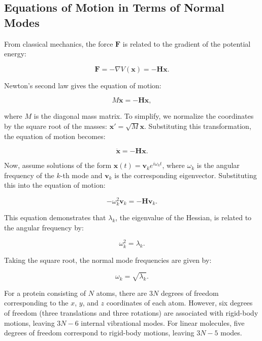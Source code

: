\documentclass[English, Lau, oneside]{sapthesis}
\begin{document}
\subsection{Equations of Motion in Terms of Normal Modes}

From classical mechanics, the force \( \mathbf{F} \) is related to the gradient of the potential energy:

\begin{equation}
\mathbf{F} = -\nabla V(\mathbf{x}) = -\mathbf{H} \mathbf{x}.
\end{equation}

Newton's second law gives the equation of motion:

\begin{equation}
M \ddot{\mathbf{x}} = -\mathbf{H} \mathbf{x},
\end{equation}

where \( M \) is the diagonal mass matrix. To simplify, we normalize the coordinates by the square root of the masses: \( \mathbf{x}' = \sqrt{M} \mathbf{x} \). Substituting this transformation, the equation of motion becomes:

\begin{equation}
\ddot{\mathbf{x}} = -\mathbf{H} \mathbf{x}.
\end{equation}

Now, assume solutions of the form \( \mathbf{x}(t) = \mathbf{v}_k e^{i \omega_k t} \), where \( \omega_k \) is the angular frequency of the \( k \)-th mode and \( \mathbf{v}_k \) is the corresponding eigenvector. Substituting this into the equation of motion:

\begin{equation}
-\omega_k^2 \mathbf{v}_k = -\mathbf{H} \mathbf{v}_k.
\end{equation}

This equation demonstrates that \( \lambda_k \), the eigenvalue of the Hessian, is related to the angular frequency by:

\begin{equation}
\omega_k^2 = \lambda_k.
\end{equation}

Taking the square root, the normal mode frequencies are given by:

\begin{equation}
\omega_k = \sqrt{\lambda_k}.
\end{equation}

For a protein consisting of \( N \) atoms, there are \( 3N \) degrees of freedom corresponding to the \( x \), \( y \), and \( z \) coordinates of each atom. However, six degrees of freedom (three translations and three rotations) are associated with rigid-body motions, leaving \( 3N - 6 \) internal vibrational modes. For linear molecules, five degrees of freedom correspond to rigid-body motions, leaving \( 3N - 5 \) modes.
\end{document}
